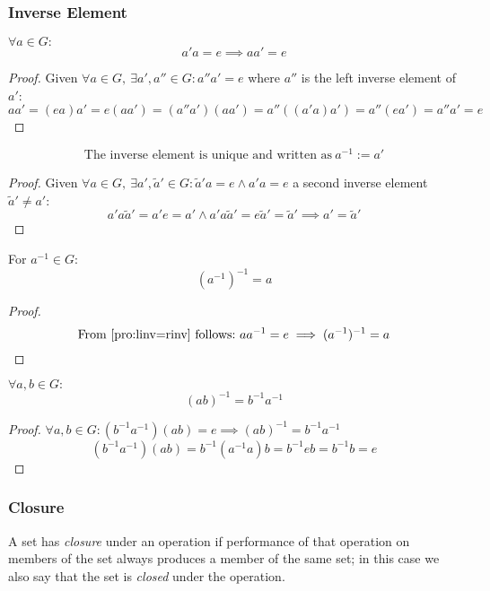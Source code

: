 \subsubsection{Inverse Element}
\begin{proposition}[Left Inverse = Right Inverse]\label{pro:linv=rinv}
   \(\forall a \in G:\)
   \[a'a = e \implies aa' = e\]
\end{proposition}
\begin{proof}
   Given \(\forall a \in G,~\exists a', a'' \in G: a''a' = e\) where \(a''\) is the left inverse element of \(a'\):
   \[aa' = (ea)a' = e(aa') = (a''a')(aa') = a''((a'a)a') = a''(ea') = a''a' = e\]
\end{proof}

\begin{proposition}[Uniqueness of \(a'\)]\label{pro:unique_a}
   \[\text{The inverse element is unique and written as} ~ a^{-1} := a'\]
\end{proposition}
\begin{proof}
   Given \(\forall a \in G,~\exists a', \tilde{a}' \in G: \tilde{a}' a = e \land a' a = e\) a second inverse element \(\tilde{a}' \neq a'\):
   \[a'a\tilde{a}' = a'e = a' \land a'a\tilde{a}' = e\tilde{a}' = \tilde{a}' \implies a' = \tilde{a}'\]
\end{proof}

\begin{corollary}[\((a^{-1})^{-1}\)]
   For \(a^{-1} \in G:\)
   \[(a^{-1})^{-1} = a\]
\end{corollary}
\begin{proof}
   \[\text{From \cref{pro:linv=rinv} follows:}~aa^{-1} = e \implies (a^{-1})^{-1} = a\]
\end{proof}

\begin{corollary}[\((ab)^{-1}\)]
   \(\forall a, b \in G:\)
   \[(ab)^{-1} = b^{-1}a^{-1}\]
\end{corollary}
\begin{proof}
   \(\forall a, b \in G: (b^{-1}a^{-1})(ab) = e \implies (ab)^{-1} = b^{-1}a^{-1}\)
   \[(b^{-1}a^{-1})(ab) = b^{-1}(a^{-1}a)b = b^{-1}eb = b^{-1}b = e\]
\end{proof}

\subsubsection{Closure}
A set has \textit{closure} under an operation if performance of that operation on members of the set always produces a member of the same set; in this case we also say that the set is \textit{closed} under the operation.

